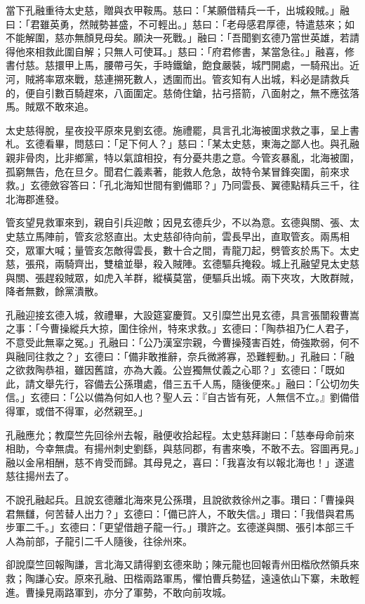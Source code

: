 當下孔融重待太史慈，贈與衣甲鞍馬。慈曰：「某願借精兵一千，出城殺賊。」融曰：「君雖英勇，然賊勢甚盛，不可輕出。」慈曰：「老母感君厚德，特遣慈來；如不能解圍，慈亦無顏見母矣。願決一死戰。」融曰：「吾聞劉玄德乃當世英雄，若請得他來相救此圍自解；只無人可使耳。」慈曰：「府君修書，某當急往。」融喜，修書付慈。慈擐甲上馬，腰帶弓矢，手時鐵鎗，飽食嚴裝，城門開處，一騎飛出。近河，賊將率眾來戰，慈連搠死數人，透圍而出。管亥知有人出城，料必是請救兵的，便自引數百騎趕來，八面圍定。慈倚住鎗，拈弓搭箭，八面射之，無不應弦落馬。賊眾不敢來追。

太史慈得脫，星夜投平原來見劉玄德。施禮罷，具言孔北海被圍求救之事，呈上書札。玄德看畢，問慈曰：「足下何人？」慈曰：「某太史慈，東海之鄙人也。與孔融親非骨肉，比非鄉黨，特以氣誼相投，有分憂共患之意。今管亥暴亂，北海被圍，孤窮無告，危在旦夕。聞君仁義素著，能救人危急，故特令某冒鋒突圍，前來求救。」玄德斂容答曰：「孔北海知世間有劉備耶？」乃同雲長、翼德點精兵三千，往北海郡進發。

管亥望見救軍來到，親自引兵迎敵；因見玄德兵少，不以為意。玄德與關、張、太史慈立馬陣前，管亥忿怒直出。太史慈卻待向前，雲長早出，直取管亥。兩馬相交，眾軍大喊；量管亥怎敵得雲長，數十合之間，青龍刀起，劈管亥於馬下。太史慈，張飛，兩騎齊出，雙槍並舉，殺入賊陣。玄德驅兵掩殺。城上孔融望見太史慈與關、張趕殺賊眾，如虎入羊群，縱橫莫當，便驅兵出城。兩下夾攻，大敗群賊，降者無數，餘黨潰散。

孔融迎接玄德入城，敘禮畢，大設筵宴慶賀。又引糜竺出見玄德，具言張闓殺曹嵩之事：「今曹操縱兵大掠，圍住徐州，特來求救。」玄德曰：「陶恭祖乃仁人君子，不意受此無辜之冤。」孔融曰：「公乃漢室宗親，今曹操殘害百姓，倚強欺弱，何不與融同往救之？」玄德曰：「備非敢推辭，奈兵微將寡，恐難輕動。」孔融曰：「融之欲救陶恭祖，雖因舊誼，亦為大義。公豈獨無仗義之心耶？」玄德曰：「既如此，請文舉先行，容備去公孫瓚處，借三五千人馬，隨後便來。」融曰：「公切勿失信。」玄德曰：「公以備為何如人也？聖人云：『自古皆有死，人無信不立。』劉備借得軍，或借不得軍，必然親至。」

孔融應允；教糜竺先回徐州去報，融便收拾起程。太史慈拜謝曰：「慈奉母命前來相助，今幸無虞。有揚州刺史劉繇，與慈同郡，有書來喚，不敢不去。容圖再見。」融以金帛相酬，慈不肯受而歸。其母見之，喜曰：「我喜汝有以報北海也！」遂遣慈往揚州去了。

不說孔融起兵。且說玄德離北海來見公孫瓚，且說欲救徐州之事。瓚曰：「曹操與君無讎，何苦替人出力？」玄德曰：「備已許人，不敢失信。」瓚曰：「我借與君馬步軍二千。」玄德曰：「更望借趙子龍一行。」瓚許之。玄德遂與關、張引本部三千人為前部，子龍引二千人隨後，往徐州來。

卻說糜竺回報陶謙，言北海又請得劉玄德來助；陳元龍也回報青州田楷欣然領兵來救；陶謙心安。原來孔融、田楷兩路軍馬，懼怕曹兵勢猛，遠遠依山下寨，未敢輕進。曹操見兩路軍到，亦分了軍勢，不敢向前攻城。

